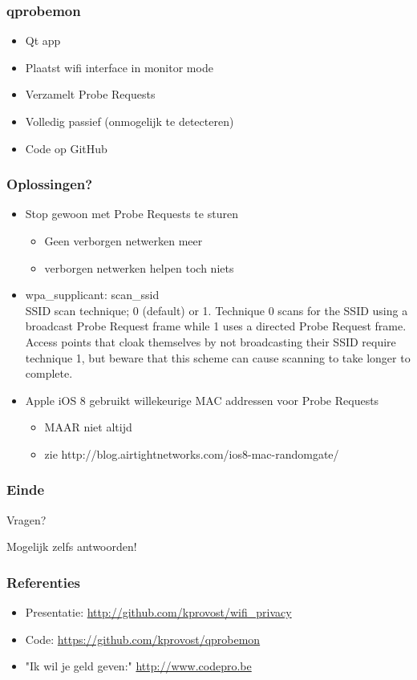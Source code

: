 \documentclass{beamer}
\begin{document}
  \begin{frame}
    \frametitle{qprobemon}

    \begin{itemize}
      \item Qt app
      \item Plaatst wifi interface in monitor mode
      \item Verzamelt Probe Requests
      \item Volledig passief (onmogelijk te detecteren)
      \item Code op GitHub
    \end{itemize}
  \end{frame}

  \begin{frame}
    \frametitle{Oplossingen?}

    \begin{itemize}
      \item Stop gewoon met Probe Requests te sturen
        \begin{itemize}
          \item Geen verborgen netwerken meer
          \item verborgen netwerken helpen toch niets
        \end{itemize}
        \item
            wpa\_supplicant: scan\_ssid \\
            SSID scan technique; 0 (default) or 1.  Technique 0 scans for the
            SSID using a broadcast Probe Request frame while 1 uses a
            directed Probe Request frame.  Access points that cloak themselves
            by not broadcasting their SSID require technique 1, but beware that
            this scheme can cause scanning to take longer to complete.
        \pause
      \item Apple iOS 8 gebruikt willekeurige MAC addressen voor Probe Requests
        \begin{itemize}
          \item MAAR niet altijd
          \item zie http://blog.airtightnetworks.com/ios8-mac-randomgate/
        \end{itemize}
    \end{itemize}
  \end{frame}

  \begin{frame}
    \frametitle{Einde}
    \begin{center}
      \Huge Vragen?
    \end{center}
    \begin{center}
      \small Mogelijk zelfs antwoorden!
    \end{center}
  \end{frame}

  \begin{frame}
    \frametitle{Referenties}
    \begin{itemize}
        \item Presentatie: \url{http://github.com/kprovost/wifi_privacy}
        \item Code: \url{https://github.com/kprovost/qprobemon}
        \item "Ik wil je geld geven:" \url{http://www.codepro.be}
    \end{itemize}
  \end{frame}
\end{document}
